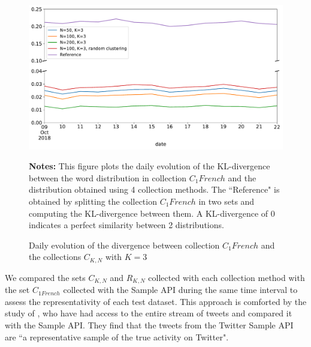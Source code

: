 \begin{figure}
\begin{center}
\includegraphics[scale=.5]{figures/KL_K=3.pdf}
\end{center}
{\scriptsize \textbf{Notes:} This figure plots the daily evolution of the KL-divergence between the word distribution in collection $C_1 French$ and the distribution obtained using 4 collection methods. The ``Reference" is obtained by splitting the collection $C_1 French$ in two sets and computing the KL-divergence between them. A KL-divergence of 0 indicates a perfect similarity between 2 distributions.}
\caption{Daily evolution of the divergence between collection $C_1 French$ and the collections $C_{K,N}$ with $K = 3$}
\label{Figure:KL_K=3}
\end{figure}

We compared the sets $C_{K,N}$ and $R_{K,N}$ collected with each collection method with the set $C_{1 French}$ collected with the Sample API during the same time interval to assess the representativity of each test dataset. This approach is comforted by the study of \citet{morstatter_when_2014}, who have had access to the entire stream of tweets and compared it with the Sample API. They find that the tweets from the Twitter Sample API are ``a representative sample of the true activity on Twitter".  


